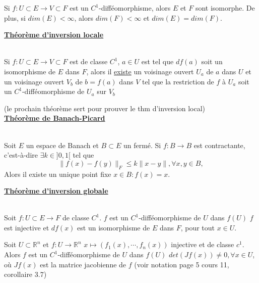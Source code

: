 \documentclass[12pt,a4paper]{article}
\begin{document}
\begin{flushleft}
\begin{cor}
Si $f: U \subset E \longrightarrow V \subset F$ est un $C^1$-difféomorphisme, alors $E$ et $F$ sont isomorphe. De plus, si $dim(E) < \infty$, alors $dim(F) < \infty$ et $dim(E) = dim(F).$
\end{cor}

\underline{\textbf{Théorème d'inversion locale}}\\~\\

\begin{thm}
Si $f: U \subset E \longrightarrow V \subset F$ est de classe $C^1$, $a\in U$ est tel que $df(a)$ soit un isomorphisme de $E$ dans $F$, alors il \underline{existe} un voisinage ouvert $U_a$ de $a$ dans $U$ et un voisinage ouvert $V_b$ de $b=f(a)$ dans $V$ tel que la restriction de $f$ à $U_a$ soit un $C^1$-difféomorphisme de $U_a$ sur $V_b$
\end{thm}

(le prochain théorème sert pour prouver le thm d'inversion local)\\
\underline{\textbf{Théorème de Banach-Picard}}\\~\\

\begin{thm}
Soit $E$ un espace de Banach et $B \subset E$ un fermé. Si $f:B \longrightarrow B$ est contractante, c'est-à-dire $\exists k \in ]0,1[$ tel que 
$$\lVert f(x) - f(y) \rVert_F \leq k \lVert x-y \rVert , \forall x,y \in B,$$ Alors il existe un unique point fixe $x \in B : f(x) = x$.
\end{thm}

\underline{\textbf{Théorème d'inversion globale}}\\~\\

\begin{thm}
Soit $f: U \subset E \longrightarrow F$ de classe $C^1$. $f$ est un $C^1$-difféomorphisme de $U$ dans $f(U)$ \ssi $f$ est injective et $df(x)$ est un isomorphisme de $E$ dans $F$, pour tout $x \in U$.
\end{thm}

\begin{cor}
Soit $U \subset \mathbb{R}^n$ et $f: U \longrightarrow  \mathbb{R}^n$ $x \mapsto (f_1(x), \cdots, f_n(x))$ injective et de classe $c^1$. Alors $f$ est un $C^1$-difféomorphisme de $U$ dans $f(U)$ \ssi $det(Jf(x)) \neq 0 , \forall x \in U$, où $Jf(x)$ est la matrice jacobienne de $f$ (voir notation page 5 cours 11, corollaire 3.7)
\end{cor}


\end{flushleft}
\end{document}
